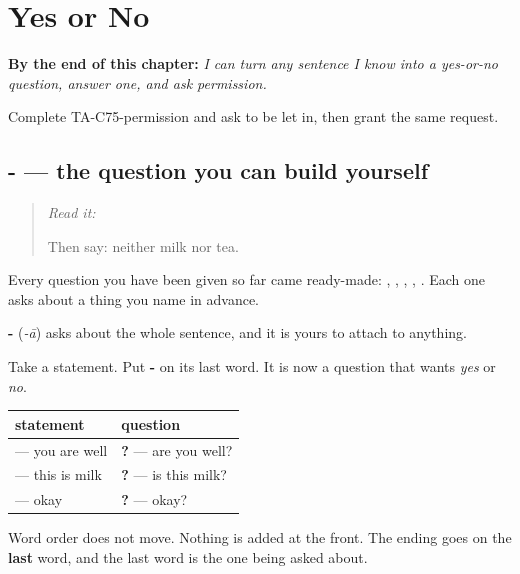 
\chapter{Yes or No}
\label{ch:ta-yes-or-no}

\begin{chapteropening}
\textbf{By the end of this chapter:} \emph{I can turn any sentence I know into a yes-or-no question, answer one, and ask permission.}

Complete TA-C75-permission and ask to be let in, then grant the same request.
\end{chapteropening}

\section[\texorpdfstring{-\ta{ஆ} (-ā)}{-ஆ (-ā)}]{- — the question you can build yourself}

\label{lesson:TA-C75-polar}



\begin{quote}
\emph{Read it:} \textbf{}

Then say: neither milk nor tea.
\end{quote}

\begin{grammarlens}[title={Grammar lens: one letter on the end}]
Every question you have been given so far came ready-made: , , , , . Each one asks about a thing you name in advance.

\textbf{-} (\emph{-ā}) asks about the whole sentence, and it is yours to attach to anything.

Take a statement. Put \textbf{-} on its last word. It is now a question that wants \emph{yes} or \emph{no}.

\noindent
\begin{tabularx}{\linewidth}{@{}>{\raggedright\arraybackslash}X>{\raggedright\arraybackslash}X@{}}
\toprule
\textbf{statement} & \textbf{question} \\
\midrule
\textbf{\ta{நீங்கள்} \ta{நலம்}} — you are well & \textbf{\ta{நீங்கள்} \ta{நலமா}?} — are you well? \\
\textbf{\ta{இது} \ta{பால்}} — this is milk & \textbf{\ta{இது} \ta{பாலா}?} — is this milk? \\
\textbf{\ta{சரி}} — okay & \textbf{\ta{சரியா}?} — okay? \\
\bottomrule
\end{tabularx}

Word order does not move. Nothing is added at the front. The ending goes on the \textbf{last} word, and the last word is the one being asked about.
\end{grammarlens}

